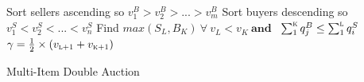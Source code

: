 \begin{algorithm}[htbp]
\DontPrintSemicolon
\SetAlgoLined
\BlankLine
{Sort sellers ascending so $v^B_{1}>v^B_{2}>...>v^B_{m}$}
    \BlankLine
 {Sort buyers descending so $v^S_{1}<v^S_{2}<...<v^S_{n}$}
    \BlankLine
{Find $max(S_L, B_K) \ \forall \ v^{}_L<v^{}_K\ \textbf{and}$ \ {$\sum_{1}^\textsc{k} q_{j}^B \leq \sum_{1}^\textsc{l} q_{i}^S$}}{
    \BlankLine
    {$\gamma = {\frac{1}{2}}\times({v_\textsc{l+1}+v_\textsc{k+1}})$}
    }
    \BlankLine
\caption{Multi-Item Double Auction}
\label{alg:MC_algorithm}
\end{algorithm}

